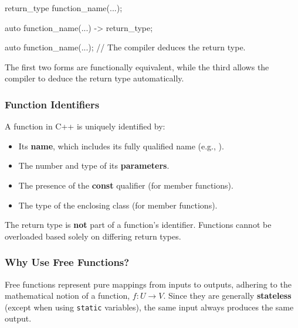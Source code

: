 \vspace{-0.5em}

\begin{codeblock}[language=C++, numbers=none]
return_type function_name(...);

auto function_name(...) -> return_type;

auto function_name(...); // The compiler deduces the return type.
\end{codeblock}

\vspace{-0.5em}

The first two forms are functionally equivalent, while the third allows the compiler to deduce the return type automatically.

\vspace{-0.5em}

\subsubsection{Function Identifiers}

\vspace{-0.5em}

A function in C++ is uniquely identified by:

\begin{itemize}
    \item Its \textbf{name}, which includes its fully qualified name (e.g., ).
    \item The number and type of its \textbf{parameters}.
    \item The presence of the \textbf{const} qualifier (for member functions).
    \item The type of the enclosing class (for member functions).
\end{itemize}

\begin{warningblock}
    The return type is \textbf{not} part of a function's identifier. Functions cannot be overloaded based solely on differing return types.
\end{warningblock}

\subsubsection{Why Use Free Functions?}

\vspace{-0.5em}

Free functions represent pure mappings from inputs to outputs, adhering to the mathematical notion of a function, $f: U \rightarrow V$. Since they are generally \textbf{stateless} (except when using \texttt{static} variables), the same input always produces the same output.


